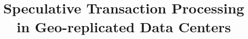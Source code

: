 \documentclass[preprint]{sigplanconf-eurosys}
\begin{document}
\newcommand\VRule[1][\arrayrulewidth]{\vrule width #1}
\newcommand{\specula}{STR\xspace}

\title{Speculative Transaction Processing in Geo-replicated Data Centers}





\maketitle
\end{document}
